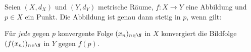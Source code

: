 Seien $(X, d_X)$ und $(Y, d_Y)$ metrische Räume, $f: X \to Y$ eine Abbildung und $p \in X$ ein Punkt. Die Abbildung ist genau dann stetig in $p$, wenn gilt:

Für \textit{jede} gegen $p$ konvergente Folge $(x_n)_{n \in \N}$ in $X$ konvergiert die Bildfolge $(f(x_n))_{n \in \N}$ in $Y$ gegen $f(p)$.